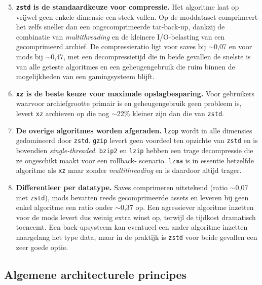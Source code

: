 \begin{enumerate}\setcounter{enumi}{4}
    \item \textbf{\texttt{zstd} is de standaardkeuze voor compressie.} Het algoritme laat op vrijwel geen enkele dimensie een steek vallen. Op de moddataset comprimeert het zelfs sneller dan een ongecomprimeerde tar-back-up, dankzij de combinatie van \textit{multithreading} en de kleinere I/O-belasting van een gecomprimeerd archief. De compressieratio ligt voor saves bij $\sim$0{,}07 en voor mods bij $\sim$0{,}47, met een decompressietijd die in beide gevallen de snelste is van alle geteste algoritmes en een geheugengebruik die ruim binnen de mogelijkheden van een gamingsysteem blijft.
    \item \textbf{\texttt{xz} is de beste keuze voor maximale opslagbesparing.} Voor gebruikers waarvoor archiefgrootte primair is en geheugengebruik geen probleem is, levert \texttt{xz} archieven op die nog $\sim$22\% kleiner zijn dan die van \texttt{zstd}.
    \item \textbf{De overige algoritmes worden afgeraden.} \texttt{lzop} wordt in alle dimensies gedomineerd door \texttt{zstd}. \texttt{gzip} levert geen voordeel ten opzichte van \texttt{zstd} en is bovendien \textit{single-threaded}. \texttt{bzip2} en \texttt{lzip} hebben een trage decompressie die ze ongeschikt maakt voor een rollback- scenario. \texttt{lzma} is in essentie hetzelfde algoritme als \texttt{xz} maar zonder \textit{multithreading} en is daardoor altijd trager.
    \item \textbf{Differentieer per datatype.} Saves comprimeren uitstekend (ratio $\sim$0{,}07 met \texttt{zstd}), mods bevatten reeds gecomprimeerde assets en leveren bij geen enkel algoritme een ratio onder $\sim$0{,}37 op. Een agressiever algoritme inzetten voor de mods levert dus weinig extra winst op, terwijl de tijdkost dramatisch toeneemt. Een back-upsysteem kan eventueel een ander algoritme inzetten naargelang het type data, maar in de praktijk is \texttt{zstd} voor beide gevallen een zeer goede optie.
\end{enumerate}

\subsection{Algemene architecturele principes}

